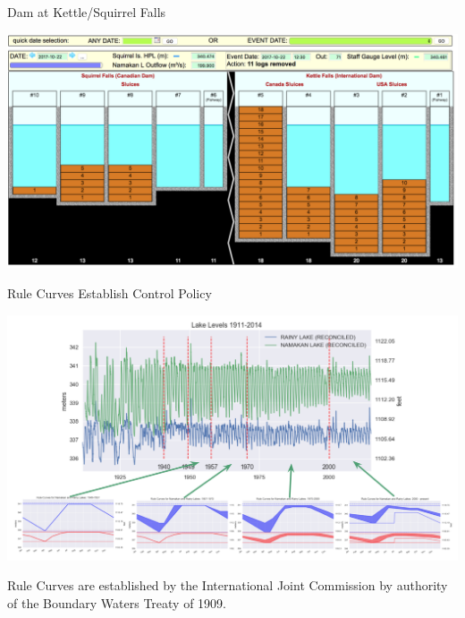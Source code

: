 \documentclass[compress,english]{beamer}
\begin{document}
\begin{frame}{Dam at Kettle/Squirrel Falls}

\begin{center}
\includegraphics[width=0.9\paperwidth]{KettleFalls}
\end{center}

\end{frame}

\begin{frame}{Rule Curves Establish Control Policy}

\begin{center}
\includegraphics[width=0.9\paperwidth]{RuleCurves}
\end{center}
Rule Curves are established by the International Joint Commission by authority of the Boundary Waters Treaty of 1909.
\end{frame}
\end{document}
